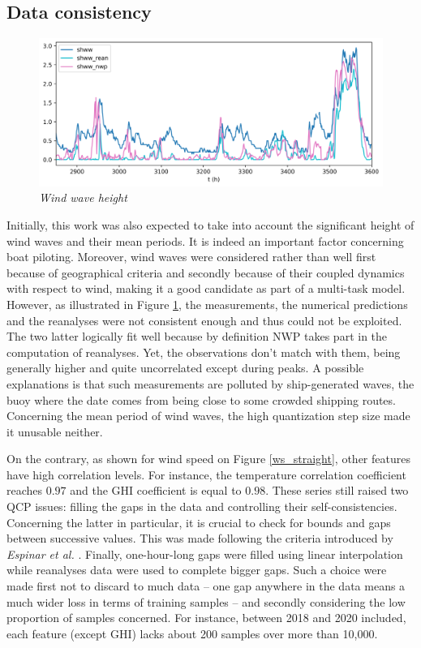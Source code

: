 \documentclass{article}
\newcommand{\saut}{\vspace{10px}}
\begin{document}
\subsection*{Data consistency}

\begin{figure}[H]
    \centering
    \includegraphics[width=.95\linewidth]{img/shww.png}
    \caption{\textit{Wind wave height}}
   \label{shww}
\end{figure}

Initially, this work was also expected to take into account the significant height of wind waves and their mean periods.
It is indeed an important factor concerning boat piloting. Moreover, wind waves were considered rather than well
first because of geographical criteria and secondly because of their coupled dynamics with respect to wind, making it
a good candidate as part of a multi-task model. However, as illustrated in Figure \ref{shww}, the measurements, the
numerical predictions and the reanalyses were not consistent enough and thus could not be exploited. The two
latter logically fit well because by definition NWP takes part in the computation of reanalyses. Yet, the observations
don't match with them, being generally higher and quite uncorrelated except during peaks.
A possible explanations is that such measurements
are polluted by ship-generated waves, the buoy where the date comes from being close to some crowded shipping
routes. Concerning the mean period of wind waves, the high quantization step size made it unusable neither.

\saut

On the contrary, as shown for wind speed on Figure \ref{ws_straight}, other features have high correlation levels.
For instance, the temperature correlation coefficient reaches $0.97$ and the GHI coefficient is equal to $0.98$.
These series still raised two QCP issues: filling the gaps in the data and controlling their self-consistencies.
Concerning the latter in particular, it is crucial to check for bounds and gaps between successive values.
This was made following the criteria introduced by \emph{Espinar et al.} \cite{espinar_quality_nodate}.
Finally, one-hour-long gaps were filled using linear interpolation while reanalyses data were used
to complete bigger gaps. Such a choice were made first not to discard to much data -- one gap anywhere in
the data means a much wider loss in terms of training samples -- and secondly considering the low proportion
of samples concerned. For instance, between 2018 and 2020 included, each feature (except GHI) lacks about
200 samples over more than 10,000.
\end{document}
